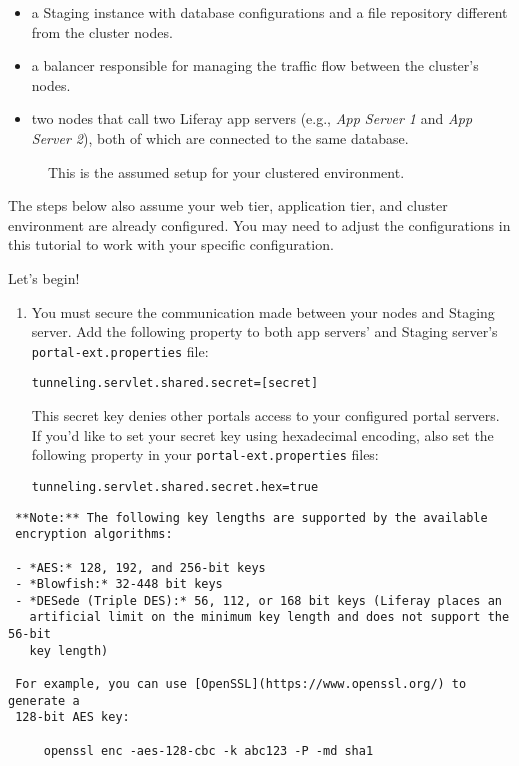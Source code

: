 \begin{itemize}
\tightlist
\item
  a Staging instance with database configurations and a file repository
  different from the cluster nodes.
\item
  a balancer responsible for managing the traffic flow between the
  cluster's nodes.
\item
  two nodes that call two Liferay app servers (e.g., \emph{App Server 1}
  and \emph{App Server 2}), both of which are connected to the same
  database.
\end{itemize}

\begin{figure}
\centering
{}
\caption{This is the assumed setup for your clustered environment.}
\end{figure}

The steps below also assume your web tier, application tier, and cluster
environment are already configured. You may need to adjust the
configurations in this tutorial to work with your specific
configuration.

Let's begin!

\begin{enumerate}
\def\labelenumi{\arabic{enumi}.}
\item
  You must secure the communication made between your nodes and Staging
  server. Add the following property to both app servers' and Staging
  server's \texttt{portal-ext.properties} file:

\begin{verbatim}
tunneling.servlet.shared.secret=[secret]
\end{verbatim}

  This secret key denies other portals access to your configured portal
  servers. If you'd like to set your secret key using hexadecimal
  encoding, also set the following property in your
  \texttt{portal-ext.properties} files:

\begin{verbatim}
tunneling.servlet.shared.secret.hex=true
\end{verbatim}
\end{enumerate}

\noindent\hrulefill

\begin{verbatim}
 **Note:** The following key lengths are supported by the available
 encryption algorithms:
 
 - *AES:* 128, 192, and 256-bit keys
 - *Blowfish:* 32-448 bit keys
 - *DESede (Triple DES):* 56, 112, or 168 bit keys (Liferay places an
   artificial limit on the minimum key length and does not support the 56-bit
   key length)
 
 For example, you can use [OpenSSL](https://www.openssl.org/) to generate a
 128-bit AES key:
 
     openssl enc -aes-128-cbc -k abc123 -P -md sha1
\end{verbatim}


